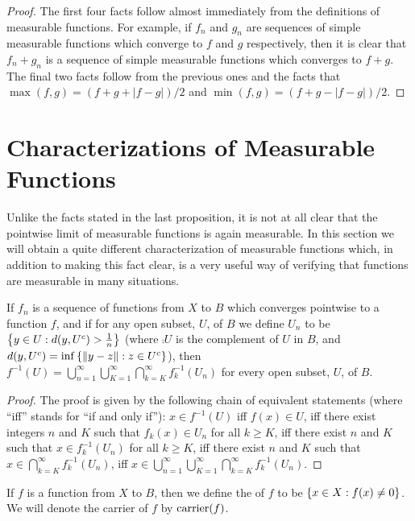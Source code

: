 \begin{proof}
The first four facts follow almost immediately from the definitions of measurable functions. For example, if $f_n$ and $g_n$ are sequences of simple measurable functions which converge to $f$ and $g$ respectively, then it is clear that $f_n+g_n$ is a sequence of simple measurable functions which converges to $f+g$. The final two facts follow from the previous ones and the facts that $\max(f, g)=(f+g+|f-g|)/2$ and $\min(f, g)=(f+g-|f-g|)/2$.
\end{proof}

\section{Characterizations of Measurable Functions}

Unlike the facts stated in the last proposition, it is not at all clear that the pointwise limit of measurable functions is again measurable. In this section we will obtain a quite different characterization of measurable functions which, in addition to making this fact clear, is a very useful way of verifying that functions are measurable in many situations.

\begin{lemma}\label{lem:preimage of open set as sigma union intersection}
If $f_n$ is a sequence of functions from $X$ to $B$ which converges pointwise to a function $f$, and if for any open subset, $U$, of $B$ we define $U_n$ to be $\left\{y\in U:d(y,{U}^c)>\frac1n\right\}$ (where $\comp{U}$ is the complement of $U$ in $B$, and $d(y,{U}^c)=\inf\left\{\norm{y-z}:z\in{U}^c\right\}$), then $f^{-1}(U)=\bigcup_{n=1}^\infty\bigcup_{K=1}^\infty\bigcap_{k=K}^\infty f_k^{-1}(U_n)$ for every open subset, $U$, of $B$.
\end{lemma}

\begin{proof}
The proof is given by the following chain of equivalent statements (where ``iff'' stands for ``if and only if''): $x\in f^{-1}(U)$ iff $f(x)\in U$, iff there exist integers $n$ and $K$ such that $f_k(x)\in U_n$ for all $k\geq K$, iff there exist $n$ and $K$ such that $x\in f_k^{-1}(U_n)$ for all $k\geq K$, iff there exist $n$ and $K$ such that $x\in\bigcap_{k=K}^\infty f_k^{-1}(U_n)$, iff $x\in\bigcup_{n=1}^\infty\bigcup_{K=1}^\infty\bigcap_{k=K}^\infty f_k^{-1}(U_n)$.
\end{proof}

\begin{definition}
If $f$ is a function from $X$ to $B$, then we define the  of $f$ to be $\left\{x\in X: f(x)\neq 0\right\}$. We will denote the carrier of $f$ by $\operatorname{carrier}(f)$. 
\end{definition}

